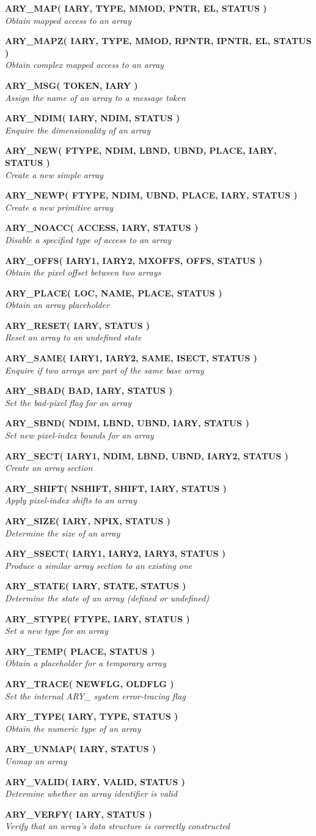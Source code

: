 \documentclass[twoside,11pt]{article}
\newcommand{\noteroutine}[2]{\textbf{#1}\hspace*{\fill}\nopagebreak \\
                             \hspace*{3em}\emph{#2}\hspace*{\fill}\par}
\begin{document}
\noteroutine{ARY\_MAP( IARY, TYPE, MMOD, PNTR, EL, STATUS )}
            {Obtain mapped access to an array}
\noteroutine{ARY\_MAPZ( IARY, TYPE, MMOD, RPNTR, IPNTR, EL, STATUS )}
            {Obtain complex mapped access to an array}
\noteroutine{ARY\_MSG( TOKEN, IARY )}
            {Assign the name of an array to a message token}
\noteroutine{ARY\_NDIM( IARY, NDIM, STATUS )}
            {Enquire the dimensionality of an array}
\noteroutine{ARY\_NEW( FTYPE, NDIM, LBND, UBND, PLACE, IARY, STATUS )}
            {Create a new simple array}
\noteroutine{ARY\_NEWP( FTYPE, NDIM, UBND, PLACE, IARY, STATUS )}
            {Create a new primitive array}
\noteroutine{ARY\_NOACC( ACCESS, IARY, STATUS )}
            {Disable a specified type of access to an array}
\noteroutine{ARY\_OFFS( IARY1, IARY2, MXOFFS, OFFS, STATUS )}
            {Obtain the pixel offset between two arrays}
\noteroutine{ARY\_PLACE( LOC, NAME, PLACE, STATUS )}
            {Obtain an array placeholder}
\noteroutine{ARY\_RESET( IARY, STATUS )}
            {Reset an array to an undefined state}
\noteroutine{ARY\_SAME( IARY1, IARY2, SAME, ISECT, STATUS )}
            {Enquire if two arrays are part of the same base array}
\noteroutine{ARY\_SBAD( BAD, IARY, STATUS )}
            {Set the bad-pixel flag for an array}
\noteroutine{ARY\_SBND( NDIM, LBND, UBND, IARY, STATUS )}
            {Set new pixel-index bounds for an array}
\noteroutine{ARY\_SECT( IARY1, NDIM, LBND, UBND, IARY2, STATUS )}
            {Create an array section}
\noteroutine{ARY\_SHIFT( NSHIFT, SHIFT, IARY, STATUS )}
            {Apply pixel-index shifts to an array}
\noteroutine{ARY\_SIZE( IARY, NPIX, STATUS )}
            {Determine the size of an array}
\noteroutine{ARY\_SSECT( IARY1, IARY2, IARY3, STATUS )}
            {Produce a similar array section to an existing one}
\noteroutine{ARY\_STATE( IARY, STATE, STATUS )}
            {Determine the state of an array (defined or undefined)}
\noteroutine{ARY\_STYPE( FTYPE, IARY, STATUS )}
            {Set a new type for an array}
\noteroutine{ARY\_TEMP( PLACE, STATUS )}
            {Obtain a placeholder for a temporary array}
\noteroutine{ARY\_TRACE( NEWFLG, OLDFLG )}
            {Set the internal ARY\_ system error-tracing flag}
\noteroutine{ARY\_TYPE( IARY, TYPE, STATUS )}
            {Obtain the numeric type of an array}
\noteroutine{ARY\_UNMAP( IARY, STATUS )}
            {Unmap an array}
\noteroutine{ARY\_VALID( IARY, VALID, STATUS )}
            {Determine whether an array identifier is valid}
\noteroutine{ARY\_VERFY( IARY, STATUS )}
            {Verify that an array's data structure is correctly constructed}
\end{document}
